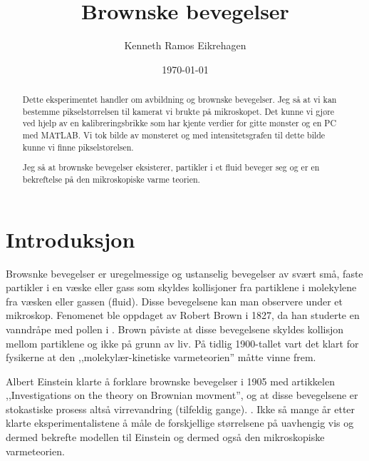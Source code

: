 \documentclass[norsk,a4paper,12pt]{article}
\title{Brownske bevegelser}
\author{Kenneth Ramos Eikrehagen}
\date{\today}
\begin{document}
\renewcommand{\abstractname}{\large Sammendrag}
\renewcommand{\contentsname}{\LARGE Innhold}
\renewcommand{\listfigurename}{\Large Figur liste}
\renewcommand{\listtablename}{\Large Tabell liste}
\renewcommand\appendixpagename{Appendix}
\renewcommand\appendixtocname{Appendix}

\lstset{language=Matlab}


\maketitle
\newpage
\tableofcontents
\listoffigures
\listoftables
\newpage





\begin{abstract}
Dette eksperimentet handler om avbildning og brownske bevegelser. Jeg så at vi kan bestemme pikselstørrelsen til kamerat vi brukte på mikroskopet. Det kunne vi gjøre ved hjelp av en kalibreringsbrikke som har kjente verdier for gitte mønster og en PC med MATLAB. Vi tok bilde av mønsteret og med intensitetsgrafen til dette bilde kunne vi finne pikselstørelsen. 

Jeg så at brownske bevegelser eksisterer, partikler i et fluid beveger seg og er en bekreftelse på den mikroskopiske varme teorien. 
\end{abstract}



\section{Introduksjon}
Browsnke bevegelser er uregelmessige og ustanselig bevegelser av svært små, faste partikler i en væske eller gass som skyldes kollisjoner fra partiklene i molekylene fra væsken eller gassen (fluid). Disse bevegelsene kan man observere under et mikroskop. Fenomenet ble oppdaget av Robert Brown i 1827, da han studerte en vanndråpe med pollen i \cite{snl}. Brown påviste at disse bevegelsene skyldes kollisjon mellom partiklene og ikke på grunn av liv. På tidlig 1900-tallet vart det klart for fysikerne at den ,,molekylær-kinetiske varmeteorien'' måtte vinne frem. 

Albert Einstein klarte å forklare brownske bevegelser i 1905 med artikkelen ,,Investigations on the theory on Brownian movment'', og at disse bevegelsene er stokastiske prosess altså virrevandring (tilfeldig gange). \cite{uio}. Ikke så mange år etter klarte eksperimentalistene å måle de forskjellige størrelsene på uavhengig vis og dermed bekrefte modellen til Einstein og dermed også den mikroskopiske varmeteorien. 
\end{document}
